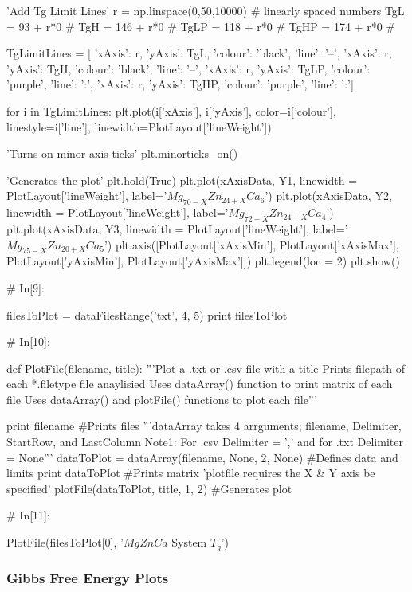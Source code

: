 \documentclass[a4paper,8pt]{article}
\begin{document}
\begin{python}
'Add Tg Limit Lines'
r = np.linspace(0,50,10000) # linearly spaced numbers
TgL = 93 + r*0 #
TgH = 146 + r*0 #
TgLP = 118 + r*0 #
TgHP = 174 + r*0 #

TgLimitLines = [
{'xAxis': r, 'yAxis': TgL, 'colour': 'black', 'line': '--'},
{'xAxis': r, 'yAxis': TgH, 'colour': 'black', 'line': '--'},
{'xAxis': r, 'yAxis': TgLP, 'colour': 'purple', 'line': ':'},
{'xAxis': r, 'yAxis': TgHP, 'colour': 'purple', 'line': ':'}]

for i in TgLimitLines:
plt.plot(i['xAxis'], i['yAxis'], 
color=i['colour'], linestyle=i['line'], 
linewidth=PlotLayout['lineWeight'])



'Turns on minor axis ticks'
plt.minorticks_on()

'Generates the plot'
plt.hold(True)
plt.plot(xAxisData, Y1, linewidth = PlotLayout['lineWeight'],
label='$Mg_{70-X}Zn_{24+X}Ca_{6}$')
plt.plot(xAxisData, Y2, linewidth = PlotLayout['lineWeight'],
label='$Mg_{72-X}Zn_{24+X}Ca_{4}$')
plt.plot(xAxisData, Y3, linewidth = PlotLayout['lineWeight'],
label='$Mg_{75-X}Zn_{20+X}Ca_{5}$')
plt.axis([PlotLayout['xAxisMin'], PlotLayout['xAxisMax'], 
PlotLayout['yAxisMin'], PlotLayout['yAxisMax']])
plt.legend(loc = 2)
plt.show()


# In[9]:

filesToPlot = dataFilesRange('txt', 4, 5)
print filesToPlot


# In[10]:

def PlotFile(filename, title):
'''Plot a .txt or .csv file with a title
Prints filepath of each *.filetype file anaylisied 
Uses dataArray() function to print matrix of each file
Uses dataArray() and plotFile() functions to plot each file'''

print filename #Prints files
'''dataArray takes 4 arrguments; filename, Delimiter, StartRow, and LastColumn
Note1: For .csv Delimiter = ',' and for .txt Delimiter = None'''
dataToPlot = dataArray(filename, None, 2, None) #Defines data and limits
print dataToPlot #Prints matrix
'plotfile requires the X & Y axis be specified'
plotFile(dataToPlot, title, 1, 2) #Generates plot


# In[11]:

PlotFile(filesToPlot[0], '$MgZnCa$ System $T_{g}$')
\end{python}

\newpage
\subsubsection{Gibbs Free Energy Plots}
\end{document}
